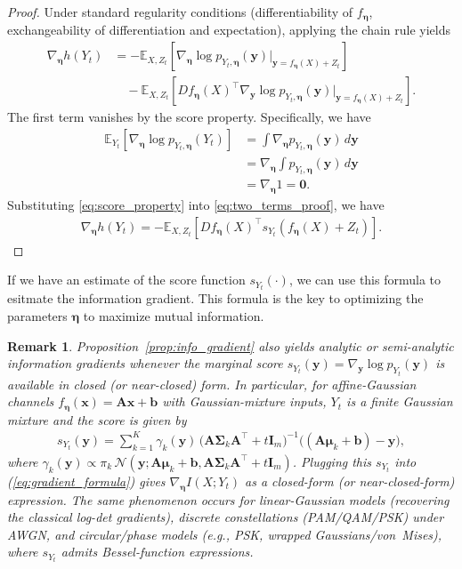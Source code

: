 \documentclass[conference]{IEEEtran}
\newtheorem{remark}{Remark}
\newcommand{\E}{\mathbb{E}}
\newcommand{\Yt}{Y_t}
\newcommand{\sYt}{s_{\Yt}}
\begin{document}
\begin{proof}
Under standard regularity conditions (differentiability of $f_{\bm \eta}$, 
exchangeability of differentiation and expectation), applying the chain rule yields
\begin{align}
\nabla_{\bm \eta} h(\Yt)
&= -\E_{X,Z_t}\left[\nabla_{\bm \eta} \log p_{\Yt,\bm \eta}(\bm y)\big|_{\bm y=f_{\bm \eta}(X)+Z_t}\right] \nonumber \\
&\quad - \E_{X,Z_t}\left[D f_{\bm \eta}(X)^\top \nabla_{\bm y} \log p_{\Yt,\bm \eta}(\bm y)\big|_{\bm y=f_{\bm \eta}(X)+Z_t}\right].
\label{eq:two_terms_proof}
\end{align}
The first term vanishes by the score property. Specifically, we have 
\begin{align}
\E_{Y_t}\left[\nabla_{\bm \eta} \log p_{\Yt,\bm \eta}(\Yt)\right]
&= \int \nabla_{\bm \eta} p_{\Yt,\bm \eta}(\bm y)\,d\bm y \\
&= \nabla_{\bm \eta} \int p_{\Yt,\bm \eta}(\bm y)\,d\bm y  \\
&= \nabla_{\bm \eta} 1 = \bm{0}.
\label{eq:score_property}
\end{align}
Substituting \eqref{eq:score_property} into \eqref{eq:two_terms_proof},
we have
\begin{align}
\nabla_{\bm \eta} h(\Yt) = -\E_{X,Z_t}\left[D f_{\bm \eta}(X)^\top \sYt(f_{\bm \eta}(X) + Z_t)\right].
\end{align}
\end{proof}

If we have an estimate of the score function $\sYt(\cdot)$, 
we can use this formula to esitmate the information gradient.
This formula is the key to optimizing the parameters $\bm \eta$ to maximize mutual information.

\begin{remark} \rm
Proposition~\ref{prop:info_gradient}
also yields \emph{analytic or semi-analytic} information gradients
whenever the marginal score $s_{Y_t}(\bm y)=\nabla_{\bm y}\log p_{Y_t}(\bm y)$
is available in closed (or near-closed) form. In particular, for
affine-Gaussian channels $f_{\bm \eta}(\bm x)=\bm A\bm x+ \bm b$ with Gaussian-mixture
inputs, $Y_t$ is a finite Gaussian mixture and the score is given by
\begin{align}
s_{Y_t}(\bm y)=\sum_{k=1}^K\gamma_k(\bm y)\,\big(\bm A\bm \Sigma_k \bm A^\top+t \bm I_m\big)^{-1}\!\big((\bm A\bm \mu_k+\bm b)-\bm y\big),
\end{align}
where $\gamma_k(\bm y)\propto \pi_k\,\mathcal N(\bm y;\bm A\bm \mu_k+\bm b,
\bm A\bm \Sigma_k \bm A^\top+t \bm I_m)$.
Plugging this $s_{Y_t}$ into (\ref{eq:gradient_formula}) gives 
$\nabla_{\bm \eta} I(X; \Yt)$ as a closed-form (or near-closed-form) expression.
The same phenomenon occurs for linear-Gaussian models
(recovering the classical log-det gradients), discrete constellations
(PAM/QAM/PSK) under AWGN, and circular/phase models (e.g., PSK,
wrapped Gaussians/von~Mises), where $s_{Y_t}$ admits Bessel-function
expressions. 
\end{remark}
\end{document}
